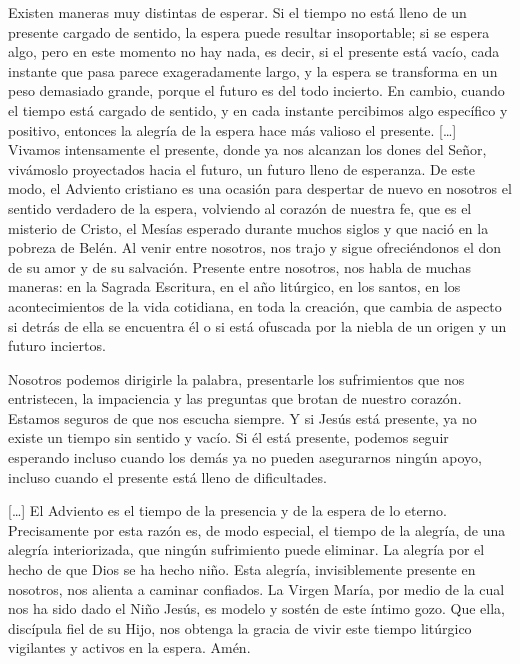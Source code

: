Existen maneras muy distintas de esperar. Si el tiempo no está lleno de un presente cargado de sentido, la espera puede resultar insoportable; si se espera algo, pero en este momento no hay nada, es decir, si el presente está vacío, cada instante que pasa parece exageradamente largo, y la espera se transforma en un peso demasiado grande, porque el futuro es del todo incierto. En cambio, cuando el tiempo está cargado de sentido, y en cada instante percibimos algo específico y positivo, entonces la alegría de la espera hace más valioso el presente. {[}\ldots{}{]} Vivamos intensamente el presente, donde ya nos alcanzan los dones del Señor, vivámoslo proyectados hacia el futuro, un futuro lleno de esperanza. De este modo, el Adviento cristiano es una ocasión para despertar de nuevo en nosotros el sentido verdadero de la espera, volviendo al corazón de nuestra fe, que es el misterio de Cristo, el Mesías esperado durante muchos siglos y que nació en la pobreza de Belén. Al venir entre nosotros, nos trajo y sigue ofreciéndonos el don de su amor y de su salvación. Presente entre nosotros, nos habla de muchas maneras: en la Sagrada Escritura, en el año litúrgico, en los santos, en los acontecimientos de la vida cotidiana, en toda la creación, que cambia de aspecto si detrás de ella se encuentra él o si está ofuscada por la niebla de un origen y un futuro inciertos.

Nosotros podemos dirigirle la palabra, presentarle los sufrimientos que nos entristecen, la impaciencia y las preguntas que brotan de nuestro corazón. Estamos seguros de que nos escucha siempre. Y si Jesús está presente, ya no existe un tiempo sin sentido y vacío. Si él está presente, podemos seguir esperando incluso cuando los demás ya no pueden asegurarnos ningún apoyo, incluso cuando el presente está lleno de dificultades.

{[}\ldots{}{]} El Adviento es el tiempo de la presencia y de la espera de lo eterno. Precisamente por esta razón es, de modo especial, el tiempo de la alegría, de una alegría interiorizada, que ningún sufrimiento puede eliminar. La alegría por el hecho de que Dios se ha hecho niño. Esta alegría, invisiblemente presente en nosotros, nos alienta a caminar confiados. La Virgen María, por medio de la cual nos ha sido dado el Niño Jesús, es modelo y sostén de este íntimo gozo. Que ella, discípula fiel de su Hijo, nos obtenga la gracia de vivir este tiempo litúrgico vigilantes y activos en la espera. Amén.